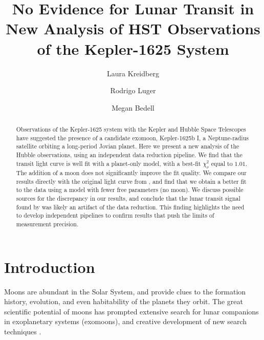 \documentclass[twocolumn]{aastex62}
\begin{document}
\title{No Evidence for Lunar Transit in New Analysis of HST Observations of the Kepler-1625 System}

\author{Laura Kreidberg}
\author{Rodrigo Luger}
\author{Megan Bedell}

\begin{abstract}
    Observations of the Kepler-1625 system with the Kepler and Hubble Space Telescopes have suggested the presence of a candidate exomoon, Kepler-1625b I, a Neptune-radius satellite orbiting a long-period Jovian planet. Here we present a new analysis of the Hubble observations, using an independent data reduction pipeline. We find that the transit light curve is well fit with a planet-only model, with a best-fit $\chi^2_\nu$ equal to $1.01$. The addition of a moon does not significantly improve the fit quality. We compare our results directly with the original light curve from \cite{teachey18b}, and find that we obtain a better fit to the data using a model with fewer free parameters (no moon).  We discuss possible sources for the discrepancy in our results, and conclude that the lunar transit signal found by \cite{teachey18b} was likely an artifact of the data reduction.  This finding highlights the need to develop independent pipelines to confirm results that push the limits of measurement precision.
\end{abstract}


\section{Introduction} \label{sec:intro}
Moons are abundant in the Solar System, and provide clues to the formation history, evolution, and even habitability of the planets they orbit. The great scientific potential of moons has prompted extensive search for lunar companions in exoplanetary systems (exomoons), and creative development of new search techniques \citep[e.g.][]{kipping09a, kipping09b, kipping13, simon10, peters13, heller14, noyola14, hippke15, agol15, sengupta16,  vanderburg18}. 
\end{document}
